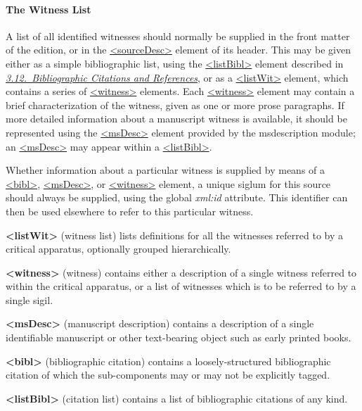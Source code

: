 \paragraph[{The Witness List}]{The Witness List}\label{TCAPWL}\par
A list of all identified witnesses should normally be supplied in the front matter of the edition, or in the \hyperref[TEI.sourceDesc]{<sourceDesc>} element of its header. This may be given either as a simple bibliographic list, using the \hyperref[TEI.listBibl]{<listBibl>} element described in \textit{\hyperref[COBI]{3.12.\ Bibliographic Citations and References}}, or as a \hyperref[TEI.listWit]{<listWit>} element, which contains a series of \hyperref[TEI.witness]{<witness>} elements. Each \hyperref[TEI.witness]{<witness>} element may contain a brief characterization of the witness, given as one or more prose paragraphs. If more detailed information about a manuscript witness is available, it should be represented using the \hyperref[TEI.msDesc]{<msDesc>} element provided by the \textsf{msdescription} module; an \hyperref[TEI.msDesc]{<msDesc>} may appear within a \hyperref[TEI.listBibl]{<listBibl>}.\par
Whether information about a particular witness is supplied by means of a \hyperref[TEI.bibl]{<bibl>}, \hyperref[TEI.msDesc]{<msDesc>}, or \hyperref[TEI.witness]{<witness>} element, a unique siglum for this source should always be supplied, using the global {\itshape xml:id} attribute. This identifier can then be used elsewhere to refer to this particular witness. 
\begin{sansreflist}
  
\item [\textbf{<listWit>}] (witness list) lists definitions for all the witnesses referred to by a critical apparatus, optionally grouped hierarchically.
\item [\textbf{<witness>}] (witness) contains either a description of a single witness referred to within the critical apparatus, or a list of witnesses which is to be referred to by a single sigil.
\item [\textbf{<msDesc>}] (manuscript description) contains a description of a single identifiable manuscript or other text-bearing object such as early printed books.
\item [\textbf{<bibl>}] (bibliographic citation) contains a loosely-structured bibliographic citation of which the sub-components may or may not be explicitly tagged.
\item [\textbf{<listBibl>}] (citation list) contains a list of bibliographic citations of any kind.
\end{sansreflist}
